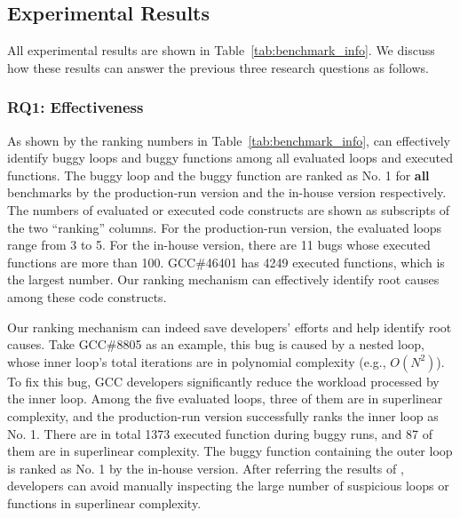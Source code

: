 \subsection{Experimental Results}
\label{sec:results}

All experimental results are shown in Table~\ref{tab:benchmark_info}.
We discuss how these results can answer 
the previous three research questions as follows.

\subsubsection{RQ1: Effectiveness}
As shown by the ranking numbers in Table~\ref{tab:benchmark_info},
\Tool can effectively identify buggy loops and buggy functions 
among all evaluated loops and executed functions.
The buggy loop and the buggy function are ranked as No. 1 for \textbf{all}
benchmarks by the production-run version and the in-house version respectively. 
The numbers of evaluated or executed code constructs are shown as subscripts of 
the two ``ranking'' columns. 
For the production-run version, the evaluated loops range from 3 to 5.
For the in-house version, there are 11 bugs whose executed functions are more than 
100.  GCC\#46401 has 4249 executed functions, 
which is the largest number.  
Our ranking mechanism can effectively identify
root causes among these code constructs.


Our ranking mechanism can indeed save developers' efforts 
and help identify root causes. 
Take GCC\#8805 as an example,
this bug is caused by a nested loop, 
whose inner loop's total iterations are in polynomial complexity (e.g., $O(N^2)$).
To fix this bug, GCC developers significantly reduce 
the workload processed by the inner loop. 
Among the five evaluated loops, three of them are in superlinear complexity, 
and the production-run version successfully ranks the inner loop as No. 1.
There are in total 1373 executed function during buggy runs,
and 87 of them are in superlinear complexity. 
The buggy function containing the outer loop is ranked as No. 1 
by the in-house version. 
After referring the results of \Tool, 
developers can avoid manually inspecting the large number of  
suspicious loops or functions in superlinear complexity. 

